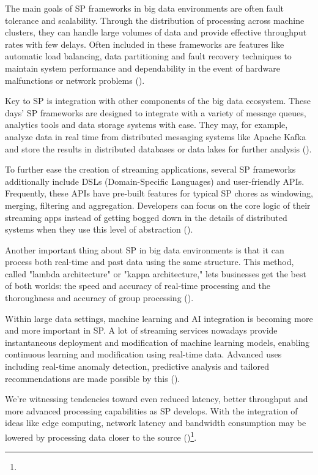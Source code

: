 The main goals of SP frameworks in big data environments are often fault tolerance and scalability. Through the distribution of processing across machine clusters, they can handle large volumes of data and provide effective throughput rates with few delays. Often included in these frameworks are features like automatic load balancing, data partitioning and fault recovery techniques to maintain system performance and dependability in the event of hardware malfunctions or network problems (\cite{Wingerath2016RealtimeSP})\footnotemark[29].

Key to SP is integration with other components of the big data ecosystem. These days' SP frameworks are designed to integrate with a variety of message queues, analytics tools and data storage systems with ease. They may, for example, analyze data in real time from distributed messaging systems like Apache Kafka and store the results in distributed databases or data lakes for further analysis (\cite{Wingerath2016RealtimeSP})\footnotemark[29].

To further ease the creation of streaming applications, several SP frameworks additionally include DSLs (Domain-Specific Languages) and user-friendly APIs. Frequently, these APIs have pre-built features for typical SP chores as windowing, merging, filtering and aggregation. Developers can focus on the core logic of their streaming apps instead of getting bogged down in the details of distributed systems when they use this level of abstraction (\cite{Wingerath2016RealtimeSP})\footnotemark[29].

Another important thing about SP in big data environments is that it can process both real-time and past data using the same structure. This method, called "lambda architecture" or "kappa architecture," lets businesses get the best of both worlds: the speed and accuracy of real-time processing and the thoroughness and accuracy of group processing (\cite{Wingerath2016RealtimeSP})\footnotemark[29].

Within large data settings, machine learning and AI integration is becoming more and more important in SP. A lot of streaming services nowadays provide instantaneous deployment and modification of machine learning models, enabling continuous learning and modification using real-time data. Advanced uses including real-time anomaly detection, predictive analysis and tailored recommendations are made possible by this (\cite{Wingerath2016RealtimeSP})\footnotemark[29].

We're witnessing tendencies toward even reduced latency, better throughput and more advanced processing capabilities as SP develops. With the integration of ideas like edge computing, network latency and bandwidth consumption may be lowered by processing data closer to the source (\cite{Wingerath2016RealtimeSP})\footnote[29]{}.

